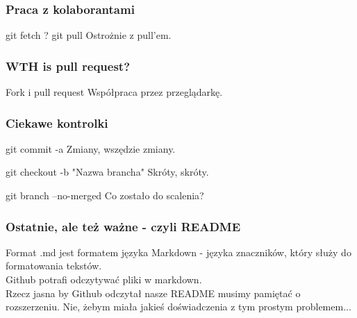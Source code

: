 \documentclass[9pt]{beamer}
\begin{document}
		
	\begin{frame}
		\frametitle{Praca z kolaborantami}

			\begin{block}{git fetch ? git pull}
				Ostrożnie z pull'em.
			\end{block}
					
						
	\end{frame}
	
		
	\begin{frame}
		\frametitle{WTH is pull request?}

			\begin{block}{Fork i pull request}
				Współpraca przez przeglądarkę.
			\end{block}								
						
	\end{frame}
	
		
	\begin{frame}
		\frametitle{Ciekawe kontrolki}

			\begin{block}{git commit -a}
				Zmiany, wszędzie zmiany.
			\end{block}

			\begin{block}{git checkout -b "Nazwa brancha"}
				Skróty, skróty.
			\end{block}	

			\begin{block}{git branch --no-merged}
				Co zostało do scalenia?
			\end{block}	
								
						
	\end{frame}



	
		\begin{frame}
		\frametitle{Ostatnie, ale też ważne - czyli README}
		
			Format .md jest formatem języka Markdown - języka znaczników, który służy do formatowania tekstów.\\
			Github potrafi odczytywać pliki w markdown.\\
			Rzecz jasna by Github odczytał nasze README musimy pamiętać o rozszerzeniu. Nie, żebym miała jakieś doświadczenia z tym prostym problemem...
						
	\end{frame}
	
\end{document}
